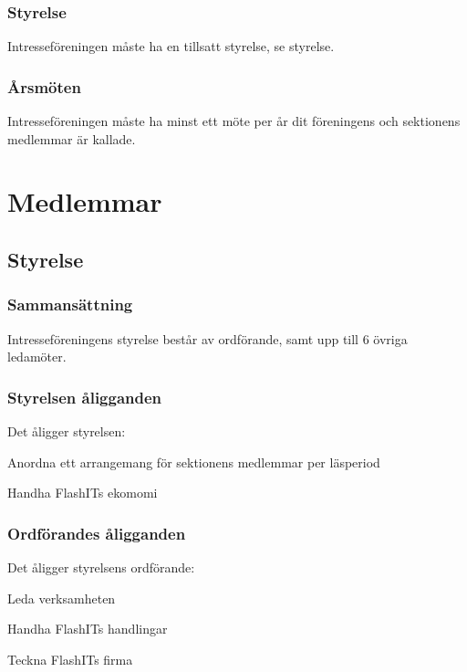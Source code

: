 \documentclass[11pt, noincludeaddress]{classes/cthit}
\begin{document}
\subsubsection{Styrelse}
Intresseföreningen måste ha en tillsatt styrelse, se {styrelse}.

\subsubsection{Årsmöten}
Intresseföreningen måste ha minst ett möte per år dit föreningens 
och sektionens medlemmar är kallade.

\newpage

\section{Medlemmar}

\subsection{Styrelse}
\label{styrelse}

\subsubsection{Sammansättning}
Intresseföreningens styrelse består av ordförande, samt upp till 6
övriga ledamöter.

\subsubsection{Styrelsen åligganden}
Det åligger styrelsen:

\begin{att}
        \item Anordna ett arrangemang för sektionens medlemmar per läsperiod
        \item Handha FlashITs ekomomi
\end{att}

\subsubsection{Ordförandes åligganden}
Det åligger styrelsens ordförande:

\begin{att}
        \item Leda verksamheten
        \item Handha FlashITs handlingar
        \item Teckna FlashITs firma
\end{att}
\end{document}
